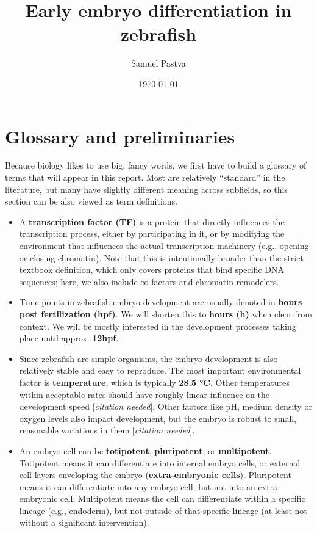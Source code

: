 \documentclass[11pt,a4paper]{article}
\title{Early embryo differentiation in zebrafish}
\author{Samuel Pastva}
\date{\today}
\newcommand{\citationneeded}{[\emph{citation needed}]}
\begin{document}
\maketitle

\section{Glossary and preliminaries}

Because biology likes to use big, fancy words, we first have to build a glossary of terms that will appear in this report. Most are relatively ``standard'' in the literature, but many have slightly different meaning across subfields, so this section can be also viewed as term definitions.

\begin{itemize}
	\item A \textbf{transcription factor (TF)} is a protein that directly influences the transcription process, either by participating in it, or by modifying the environment that influences the actual transcription machinery (e.g., opening or closing chromatin). Note that this is intentionally broader than the strict textbook definition, which only covers proteins that bind specific DNA sequences; here, we also include co-factors and chromatin remodelers.
	\item Time points in zebrafish embryo development are usually denoted in \textbf{hours post fertilization (hpf)}. We will shorten this to \textbf{hours (h)} when clear from context. We will be mostly interested in the development processes taking place until approx. \textbf{12hpf}.
	\item Since zebrafish are simple organisms, the embryo development is also relatively stable and easy to reproduce. The most important environmental factor is \textbf{temperature}, which is typically \textbf{28.5 °C}. Other temperatures within acceptable rates should have roughly linear influence on the development speed \citationneeded. Other factors like pH, medium density or oxygen levels also impact development, but the embryo is robust to small, reasonable variations in them \citationneeded.
	\item An embryo cell can be \textbf{totipotent}, \textbf{pluripotent}, or \textbf{multipotent}. Totipotent means it can differentiate into internal embryo cells, or external cell layers enveloping the embryo (\textbf{extra-embryonic cells}). Pluripotent means it can differentiate into any embryo cell, but not into an extra-embryonic cell. Multipotent means the cell can differentiate within a specific lineage (e.g., endoderm), but not outside of that specific lineage (at least not without a significant intervention).

\end{itemize}
\end{document}
